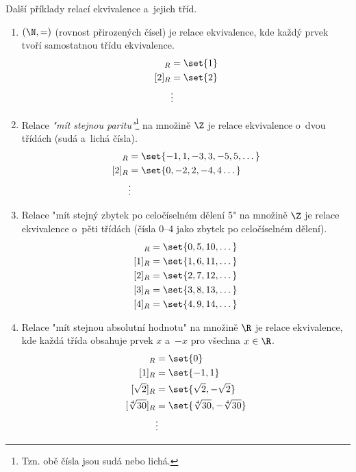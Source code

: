 \begin{example}
    Další příklady relací ekvivalence a~jejich tříd.
    \begin{enumerate}[label=(\roman*)]
        \item $(\N,=)$ (rovnost přirozených čísel) je relace ekvivalence, kde každý prvek tvoří samostatnou třídu ekvivalence.
        \begin{align*}
            [1]_R&=\set{1}\\
            [2]_R&=\set{2}\\
            &\vdots
        \end{align*}
        \item Relace \emph{"mít stejnou paritu"}\footnote{Tzn. obě čísla jsou sudá nebo lichá.} na množině $\Z$ je relace ekvivalence o~dvou třídách (sudá a~lichá čísla).
        \begin{align*}
            [1]_R&=\set{-1,1,-3,3,-5,5,\dots}\\
            [2]_R&=\set{0,-2,2,-4,4\dots}\\
            &\vdots
        \end{align*}
        \item Relace "mít stejný zbytek po celočíselném dělení 5" na množině $\Z$ je relace ekvivalence o~pěti třídách (čísla 0--4 jako zbytek po celočíselném dělení).
        \begin{align*}
            [0]_R&=\set{0,5,10,\dots}\\
            [1]_R&=\set{1,6,11,\dots}\\
            [2]_R&=\set{2,7,12,\dots}\\
            [3]_R&=\set{3,8,13,\dots}\\
            [4]_R&=\set{4,9,14,\dots}
        \end{align*}
        \item Relace "mít stejnou absolutní hodnotu" na množině $\R$ je relace ekvivalence, kde každá třída obsahuje prvek $x$ a~$-x$ pro všechna $x\in\R$.
        \begin{align*}
            [0]_R&=\set{0}\\
            [1]_R&=\set{-1,1}\\
            [\sqrt{2}]_R&=\set{\sqrt{2},-\sqrt{2}}\\
            [\sqrt[4]{30}]_R&=\set{\sqrt[4]{30},-\sqrt[4]{30}}\\
            &\vdots
        \end{align*}
    \end{enumerate}
\end{example}

